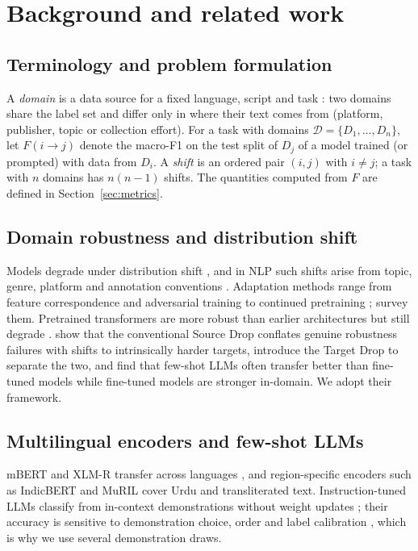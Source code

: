 \documentclass[acmsmall,screen]{acmart}
\begin{document}
\section{Background and related work}

\subsection{Terminology and problem formulation}\label{sec:terminology}
A \emph{domain} is a data source for a fixed language, script and task \citep{calderon2024measuring}: two domains share the label set and differ only in where their text comes from (platform, publisher, topic or collection effort). For a task with domains $\mathcal{D}=\{D_1,\dots,D_n\}$, let $F(i\to j)$ denote the macro-F1 on the test split of $D_j$ of a model trained (or prompted) with data from $D_i$. A \emph{shift} is an ordered pair $(i,j)$ with $i\neq j$; a task with $n$ domains has $n(n-1)$ shifts. The quantities computed from $F$ are defined in Section~\ref{sec:metrics}.

\subsection{Domain robustness and distribution shift}
Models degrade under distribution shift \citep{bendavid2010theory,koh2021wilds}, and in NLP such shifts arise from topic, genre, platform and annotation conventions \citep{blitzer2007biographies,miller2020effect}. Adaptation methods range from feature correspondence \citep{blitzer2006scl} and adversarial training \citep{ganin2016dann} to continued pretraining \citep{gururangan2020dont}; \citet{ramponi2020neural} survey them. Pretrained transformers are more robust than earlier architectures but still degrade \citep{hendrycks2020pretrained}. \citet{calderon2024measuring} show that the conventional Source Drop conflates genuine robustness failures with shifts to intrinsically harder targets, introduce the Target Drop to separate the two, and find that few-shot LLMs often transfer better than fine-tuned models while fine-tuned models are stronger in-domain. We adopt their framework.

\subsection{Multilingual encoders and few-shot LLMs}
mBERT \citep{devlin2019bert} and XLM-R \citep{conneau2020xlmr} transfer across languages \citep{pires2019multilingual,wu2019beto}, and region-specific encoders such as IndicBERT \citep{kakwani2020indicnlpsuite} and MuRIL \citep{khanuja2021muril} cover Urdu and transliterated text. Instruction-tuned LLMs classify from in-context demonstrations without weight updates \citep{brown2020gpt3}; their accuracy is sensitive to demonstration choice, order and label calibration \citep{zhao2021calibrate,lu2022fantastically,min2022rethinking}, which is why we use several demonstration draws.
\end{document}
